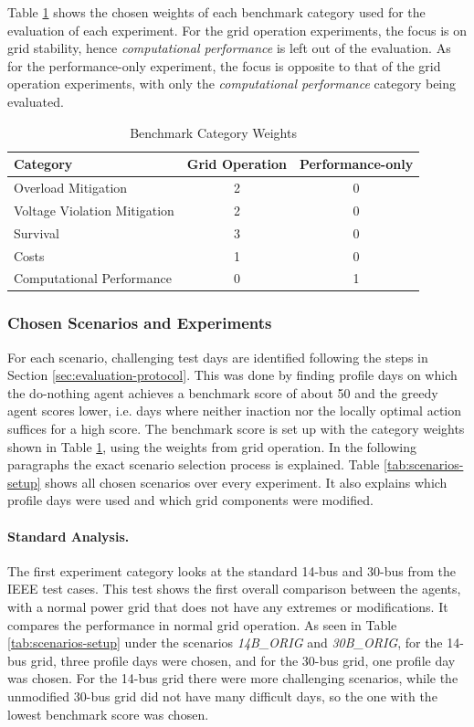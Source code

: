 Table \ref{tab:cat-weights-setup} shows the chosen weights of each benchmark category used for the evaluation of each experiment. For the grid operation experiments, the focus is on grid stability, hence \textit{computational performance} is left out of the evaluation. As for the performance-only experiment, the focus is opposite to that of the grid operation experiments, with only the \textit{computational performance} category being evaluated.

\begin{table}[htbp]
    \centering
    \caption{Benchmark Category Weights}
    \label{tab:cat-weights-setup}
    \begin{tabular}{lcc}
        \hline
        Category & Grid Operation & Performance-only \\
        \hline
        Overload Mitigation & 2 & 0 \\
        Voltage Violation Mitigation & 2 & 0 \\
        Survival & 3 & 0 \\
        Costs & 1 & 0 \\
        Computational Performance & 0 & 1 \\
        \hline
    \end{tabular}
\end{table}


\subsubsection{Chosen Scenarios and Experiments}
For each scenario, challenging test days are identified following the steps in Section \ref{sec:evaluation-protocol}. This was done by finding profile days on which the do-nothing agent achieves a benchmark score of about 50 and the greedy agent scores lower, i.e. days where neither inaction nor the locally optimal action suffices for a high score. The benchmark score is set up with the category weights shown in Table \ref{tab:cat-weights-setup}, using the weights from grid operation. In the following paragraphs the exact scenario selection process is explained. Table \ref{tab:scenarios-setup} shows all chosen scenarios over every experiment. It also explains which profile days were used and which grid components were modified. 

\paragraph{Standard Analysis.}
The first experiment category looks at the standard 14-bus and 30-bus from the IEEE test cases. This test shows the first overall comparison between the agents, with a normal power grid that does not have any extremes or modifications. It compares the performance in normal grid operation. As seen in Table \ref{tab:scenarios-setup} under the scenarios \textit{14B\_ORIG} and \textit{30B\_ORIG}, for the 14-bus grid, three profile days were chosen, and for the 30-bus grid, one profile day was chosen. For the 14-bus grid there were more challenging scenarios, while the unmodified 30-bus grid did not have many difficult days, so the one with the lowest benchmark score was chosen.

